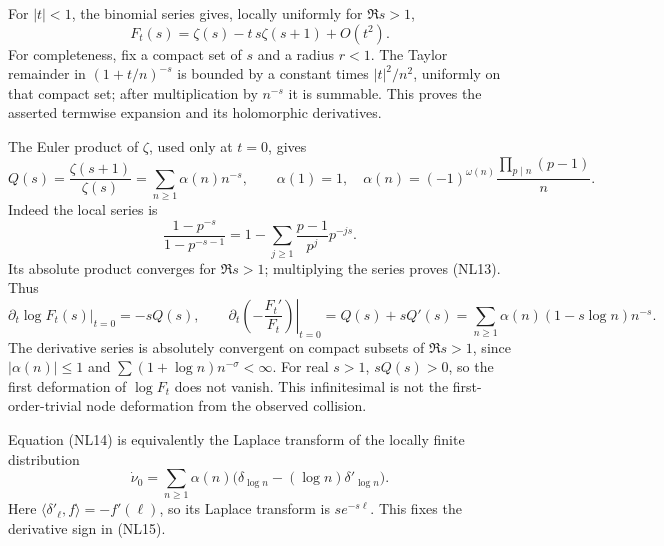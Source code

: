 \documentclass[
  10pt,
  a4paper,
]{article}
\begin{document}
For \(|t|<1\), the binomial series gives, locally uniformly for
\(\Re s>1\), \[
F_t(s)=\zeta(s)-t\,s\zeta(s+1)+O(t^2).
\tag{NL12}
\] For completeness, fix a compact set of \(s\) and a radius \(r<1\).
The Taylor remainder in \((1+t/n)^{-s}\) is bounded by a constant times
\(|t|^2/n^2\), uniformly on that compact set; after multiplication by
\(n^{-s}\) it is summable. This proves the asserted termwise expansion
and its holomorphic derivatives.

The Euler product of \(\zeta\), used only at \(t=0\), gives \[
Q(s)=\frac{\zeta(s+1)}{\zeta(s)}
=\sum_{n\ge1}\alpha(n)n^{-s},\qquad
\alpha(1)=1,\quad
\alpha(n)=(-1)^{\omega(n)}\frac{\prod_{p\mid n}(p-1)}{n}.
\tag{NL13}
\] Indeed the local series is \[
\frac{1-p^{-s}}{1-p^{-s-1}}
=1-\sum_{j\ge1}\frac{p-1}{p^j}p^{-js}.
\] Its absolute product converges for \(\Re s>1\); multiplying the
series proves (NL13). Thus \[
\left.\partial_t\log F_t(s)\right|_{t=0}=-sQ(s),
\qquad
\left.\partial_t\left(-\frac{F_t'}{F_t}\right)\right|_{t=0}
=Q(s)+sQ'(s)
=\sum_{n\ge1}\alpha(n)(1-s\log n)n^{-s}.
\tag{NL14}
\] The derivative series is absolutely convergent on compact subsets of
\(\Re s>1\), since \(|\alpha(n)|\le1\) and
\(\sum(1+\log n)n^{-\sigma}<\infty\). For real \(s>1\), \(sQ(s)>0\), so
the first deformation of \(\log F_t\) does not vanish. This
infinitesimal is not the first-order-trivial node deformation from the
observed collision.

Equation (NL14) is equivalently the Laplace transform of the locally
finite distribution \[
\dot\nu_0=
\sum_{n\ge1}\alpha(n)
\bigl(\delta_{\log n}-(\log n)\delta'_{\log n}\bigr).
\tag{NL15}
\] Here \(\langle\delta'_\ell,f\rangle=-f'(\ell)\), so its Laplace
transform is \(s e^{-s\ell}\). This fixes the derivative sign in (NL15).
\end{document}
